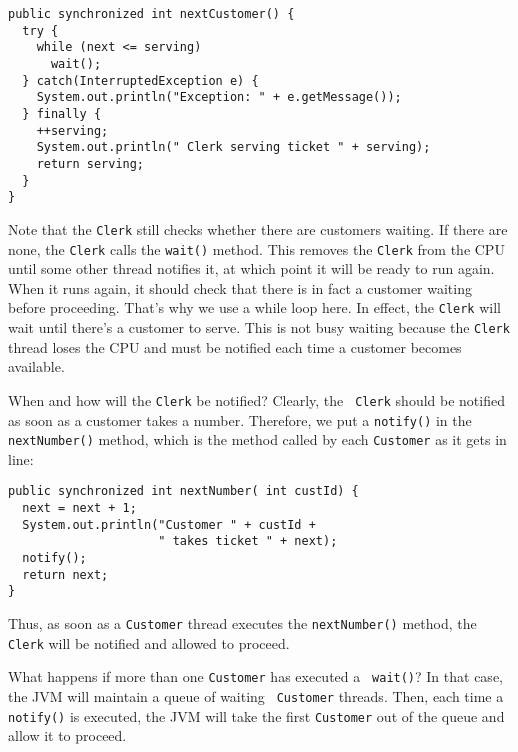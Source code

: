 \begin{jjjlisting}[26.5pc]
\begin{lstlisting}
public synchronized int nextCustomer() {
  try {
    while (next <= serving)
      wait();
  } catch(InterruptedException e) {
    System.out.println("Exception: " + e.getMessage());
  } finally {
    ++serving;
    System.out.println(" Clerk serving ticket " + serving);
    return serving;
  }
}
\end{lstlisting}
\end{jjjlisting}

\noindent Note that the {\tt Clerk} still checks whether
there are customers waiting.  If there are none, the {\tt Clerk} calls
the {\tt wait()} method.  This removes the {\tt Clerk} from the CPU
until some other thread notifies it, at which point it will be ready
to run again.  When it runs again, it should check that there is in
fact a customer waiting before proceeding.  That's why we use a
while loop here.  In effect, the {\tt Clerk} will wait until there's a
customer to serve.   This is not busy waiting because the
{\tt Clerk} thread loses the CPU and must be notified each time a customer
becomes available.

When and how will the {\tt Clerk} be notified? Clearly, the {\tt
Clerk} should be notified as soon as a customer takes a number.
Therefore, we put a {\tt notify()} in the {\tt nextNumber()} method,
which is the method called by each {\tt Customer} as it gets in line:

\begin{jjjlisting}
\begin{lstlisting}
public synchronized int nextNumber( int custId) {
  next = next + 1;
  System.out.println("Customer " + custId + 
                     " takes ticket " + next);
  notify();
  return next;
}
\end{lstlisting}
\end{jjjlisting}

\noindent Thus, as soon as a {\tt Customer} thread executes the
{\tt nextNumber()} method, the {\tt Clerk} will be notified and allowed
to proceed. 

What happens if more than one {\tt Customer} has executed a {\tt
wait()}?  In that case, the JVM will maintain a queue of waiting {\tt
Customer} threads.  Then, each time a {\tt notify()} is executed, the
JVM will take the first {\tt Customer} out of the queue and allow it
to proceed.


